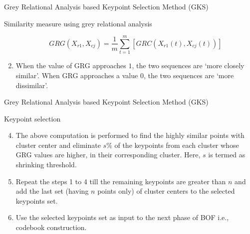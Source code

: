 \documentclass [9pt,times] {beamer}
\begin{document}
\begin{frame}[fragile]{Grey Relational Analysis based Keypoint Selection Method (GKS)}
\begin{block}{Similarity measure using grey relational analysis}
\begin{enumerate}
	\begin{equation*} \label{eq:grg}
GRG (X_{r1}, X_{cj})= \frac{1}{m}\sum_{t=1}^m[ GRC(X_{r1}(t), X_{cj}(t))]
\end{equation*}

\item When the value of GRG approaches $1$, the two sequences are `more closely similar'. When GRG approaches a value $0$, the two sequences are `more dissimilar'.
\end{enumerate}
\end{block}	
	\end{frame}
	
\begin{frame}[fragile]{Grey Relational Analysis based Keypoint Selection Method (GKS)}

\begin{block}{Keypoint selection}
\begin{enumerate}
\setcounter{enumi}{3}
\item The above computation is performed to find the highly similar points with cluster center and eliminate $s\%$ of the keypoints from each cluster whose GRG values are higher, in their corresponding cluster. Here, $s$ is termed as shrinking threshold. 
\item Repeat the steps 1 to 4 till the remaining keypoints are greater than $n$ and add  the last set (having $n$ points only) of cluster centers to the selected keypoints set.

\item Use the selected keypoints set as input to the next phase of BOF i.e., codebook construction.


\end{enumerate}
	
\end{block}
\end{frame}
	
\end{document}
